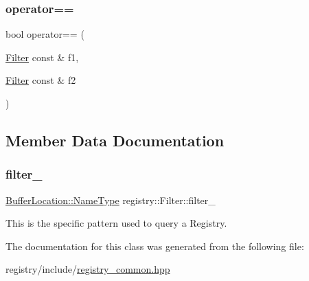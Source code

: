 \subsubsection{\texorpdfstring{operator==}{operator==}}
{\footnotesize\ttfamily bool operator== (\begin{DoxyParamCaption}\item[{\hyperlink{classregistry_1_1Filter}{Filter} const \&}]{f1,  }\item[{\hyperlink{classregistry_1_1Filter}{Filter} const \&}]{f2 }\end{DoxyParamCaption})\hspace{0.3cm}{\ttfamily [friend]}}



\subsection{Member Data Documentation}
\mbox{\label{classregistry_1_1Filter_a36d1de00325358200ebe9edadc92f14f}} 
\subsubsection{\texorpdfstring{filter\+\_\+}{filter\_}}
{\footnotesize\ttfamily \hyperlink{structregistry_1_1BufferLocation_ad3c2279012b74798fa1e348507020fa4}{Buffer\+Location\+::\+Name\+Type} registry\+::\+Filter\+::filter\+\_\+\hspace{0.3cm}{\ttfamily [private]}}



This is the specific pattern used to query a Registry. 



The documentation for this class was generated from the following file\+:\begin{DoxyCompactItemize}
\item 
registry/include/\hyperlink{registry__common_8hpp}{registry\+\_\+common.\+hpp}\end{DoxyCompactItemize}
